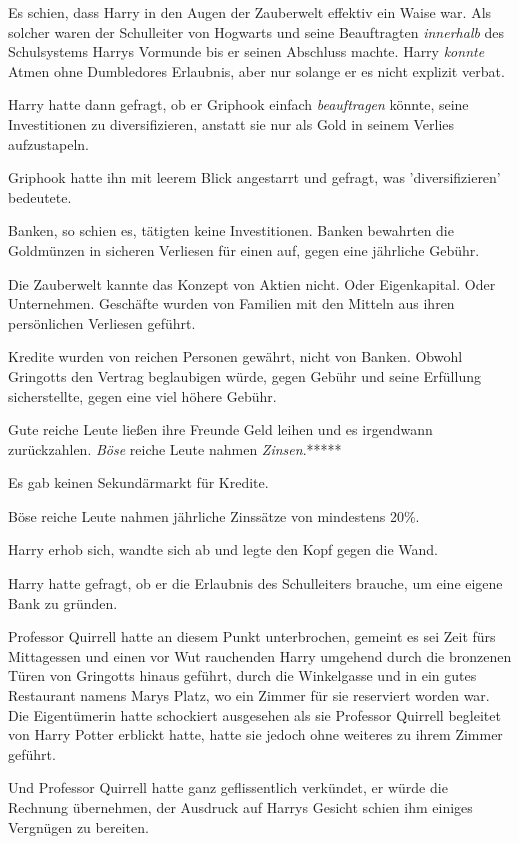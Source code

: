 {Es schien, dass Harry in den Augen der Zauberwelt effektiv ein Waise war. Als solcher waren der Schulleiter von Hogwarts und seine Beauftragten \emph{innerhalb} des Schulsystems Harrys Vormunde bis er seinen Abschluss machte. Harry \emph{konnte} Atmen ohne Dumbledores Erlaubnis, aber nur solange er es nicht explizit verbat.

Harry hatte dann gefragt, ob er Griphook einfach \emph{beauftragen} könnte, seine Investitionen zu diversifizieren, anstatt sie nur als Gold in seinem Verlies aufzustapeln.

Griphook hatte ihn mit leerem Blick angestarrt und gefragt, was 'diversifizieren' bedeutete.

Banken, so schien es, tätigten keine Investitionen. Banken bewahrten die Goldmünzen in sicheren Verliesen für einen auf, gegen eine jährliche Gebühr.

Die Zauberwelt kannte das Konzept von Aktien nicht. Oder Eigenkapital. Oder Unternehmen. Geschäfte wurden von Familien mit den Mitteln aus ihren persönlichen Verliesen geführt.

Kredite wurden von reichen Personen gewährt, nicht von Banken. Obwohl Gringotts den Vertrag beglaubigen würde, gegen Gebühr und seine Erfüllung sicherstellte, gegen eine viel höhere Gebühr.

Gute reiche Leute ließen ihre Freunde Geld leihen und es irgendwann zurückzahlen. \emph{Böse} reiche Leute nahmen \emph{Zinsen}.*****

Es gab keinen Sekundärmarkt für Kredite.

Böse reiche Leute nahmen jährliche Zinssätze von mindestens 20\%.

Harry erhob sich, wandte sich ab und legte den Kopf gegen die Wand.

Harry hatte gefragt, ob er die Erlaubnis des Schulleiters brauche, um eine eigene Bank zu gründen.

Professor Quirrell hatte an diesem Punkt unterbrochen, gemeint es sei Zeit fürs Mittagessen und einen vor Wut rauchenden Harry umgehend durch die bronzenen Türen von Gringotts hinaus geführt, durch die Winkelgasse und in ein gutes Restaurant namens Marys Platz, wo ein Zimmer für sie reserviert worden war. Die Eigentümerin hatte schockiert ausgesehen als sie Professor Quirrell begleitet von Harry Potter erblickt hatte, hatte sie jedoch ohne weiteres zu ihrem Zimmer geführt.

Und Professor Quirrell hatte ganz geflissentlich verkündet, er würde die Rechnung übernehmen, der Ausdruck auf Harrys Gesicht schien ihm einiges Vergnügen zu bereiten.

}
